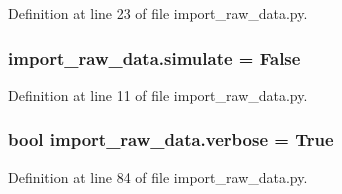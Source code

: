 Definition at line 23 of file import\+\_\+raw\+\_\+data.\+py.

\subsubsection[{\texorpdfstring{simulate}{simulate}}]{\setlength{\rightskip}{0pt plus 5cm}import\+\_\+raw\+\_\+data.\+simulate = False}\hypertarget{namespaceimport__raw__data_a5c1eb8a7efc38978b19a0f6d989467b4}{}\label{namespaceimport__raw__data_a5c1eb8a7efc38978b19a0f6d989467b4}


Definition at line 11 of file import\+\_\+raw\+\_\+data.\+py.

\subsubsection[{\texorpdfstring{verbose}{verbose}}]{\setlength{\rightskip}{0pt plus 5cm}bool import\+\_\+raw\+\_\+data.\+verbose = True}\hypertarget{namespaceimport__raw__data_a4afd55fb1fb71444d887e41c701ce960}{}\label{namespaceimport__raw__data_a4afd55fb1fb71444d887e41c701ce960}


Definition at line 84 of file import\+\_\+raw\+\_\+data.\+py.

